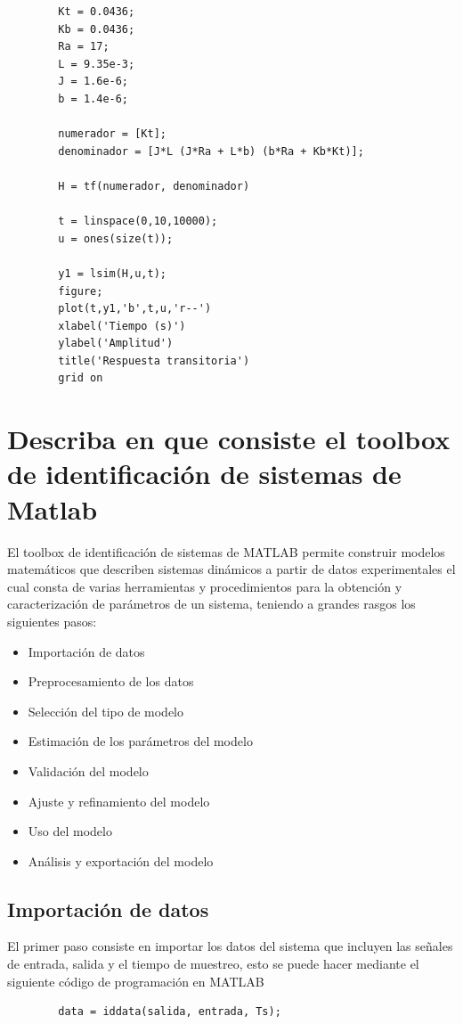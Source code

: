 \documentclass[conference]{IEEEtran}
\begin{document}
	\begin{lstlisting}
		Kt = 0.0436;
		Kb = 0.0436;
		Ra = 17;
		L = 9.35e-3;
		J = 1.6e-6;
		b = 1.4e-6;
		
		numerador = [Kt];
		denominador = [J*L (J*Ra + L*b) (b*Ra + Kb*Kt)];
		
		H = tf(numerador, denominador)
		
		t = linspace(0,10,10000);    
		u = ones(size(t));
		
		y1 = lsim(H,u,t);
		figure;
		plot(t,y1,'b',t,u,'r--')
		xlabel('Tiempo (s)')
		ylabel('Amplitud')
		title('Respuesta transitoria')
		grid on
	\end{lstlisting}
	
	\section{Describa en que consiste el toolbox de identificación de sistemas de Matlab}
	
	El toolbox de identificación de sistemas de MATLAB permite construir modelos matemáticos que describen sistemas dinámicos a partir de datos experimentales el cual consta de varias herramientas y procedimientos para la obtención y caracterización de parámetros de un sistema, teniendo a grandes rasgos los siguientes pasos:
	\begin{itemize}
		\item Importación de datos
		\item Preprocesamiento de los datos
		\item Selección del tipo de modelo
		\item Estimación de los parámetros del modelo
		\item Validación del modelo
		\item Ajuste y refinamiento del modelo
		\item Uso del modelo
		\item Análisis y exportación del modelo
	\end{itemize}
	
	\subsection{Importación de datos}
	El primer paso consiste en importar los datos del sistema que incluyen las señales de entrada, salida y el tiempo de muestreo, esto se puede hacer mediante el siguiente código de programación en MATLAB
	
	\begin{lstlisting}
		data = iddata(salida, entrada, Ts);
	\end{lstlisting}
	
\end{document}
